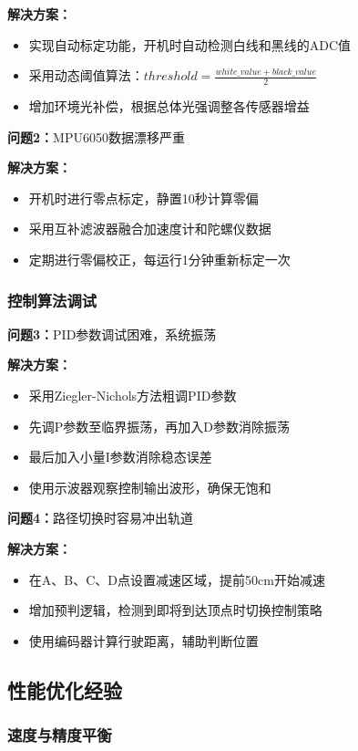 \documentclass[UTF8]{ctexart}
\begin{document}
\textbf{解决方案：}
\begin{itemize}
    \item 实现自动标定功能，开机时自动检测白线和黑线的ADC值
    \item 采用动态阈值算法：$threshold = \frac{white\_value + black\_value}{2}$
    \item 增加环境光补偿，根据总体光强调整各传感器增益
\end{itemize}

\textbf{问题2：}MPU6050数据漂移严重

\textbf{解决方案：}
\begin{itemize}
    \item 开机时进行零点标定，静置10秒计算零偏
    \item 采用互补滤波器融合加速度计和陀螺仪数据
    \item 定期进行零偏校正，每运行1分钟重新标定一次
\end{itemize}

\subsubsection{控制算法调试}

\textbf{问题3：}PID参数调试困难，系统振荡

\textbf{解决方案：}
\begin{itemize}
    \item 采用Ziegler-Nichols方法粗调PID参数
    \item 先调P参数至临界振荡，再加入D参数消除振荡
    \item 最后加入小量I参数消除稳态误差
    \item 使用示波器观察控制输出波形，确保无饱和
\end{itemize}

\textbf{问题4：}路径切换时容易冲出轨道

\textbf{解决方案：}
\begin{itemize}
    \item 在A、B、C、D点设置减速区域，提前50cm开始减速
    \item 增加预判逻辑，检测到即将到达顶点时切换控制策略
    \item 使用编码器计算行驶距离，辅助判断位置
\end{itemize}

\subsection{性能优化经验}

\subsubsection{速度与精度平衡}
\end{document}
